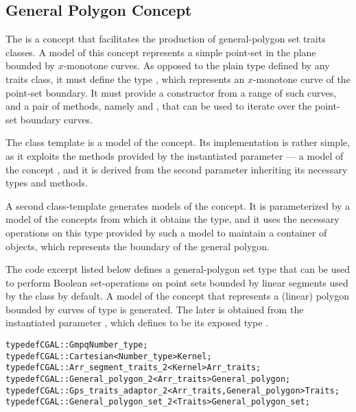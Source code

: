 \subsection{General Polygon Concept}
\label{bobs_ssec:general_polygon_concept}
The  is a concept that facilitates the
production of general-polygon set traits classes. A model of this
concept represents a simple point-set in the plane bounded
by $x$-monotone curves. As opposed to the plain
 type defined by any traits class, it must
define the type , which represents an
$x$-monotone curve of the point-set boundary. It must provide a
constructor from a range of such curves, and a pair of methods, namely
 and , that can be used to
iterate over the point-set boundary curves.
 
The 
class template is a model of the 
concept. Its implementation is rather simple, as it exploits the
methods provided by the instantiated parameter
 --- a model of the concept
, and it is derived from the second
parameter  inheriting its necessary types
and methods. 

A second class-template
generates models of the  concept. It is
parameterized by a model of the 
concepts from which it obtains the  type, and
it uses the necessary operations on this type provided by such a model
to maintain a container of  objects, which
represents the boundary of the general polygon.

The code excerpt listed below defines a general-polygon set type that
can be used to perform Boolean set-operations on point sets bounded by
linear segments used by the  class by default. A
model of the  concept that represents a
(linear) polygon bounded by curves of type  is
generated. The later is obtained from the instantiated parameter
, which defines  to be
its exposed type .
\begin{alltt}
typedef CGAL::Gmpq                                             Number_type;
typedef CGAL::Cartesian<Number_type>                           Kernel;
typedef CGAL::Arr_segment_traits_2<Kernel>                     Arr_traits;
typedef CGAL::General_polygon_2<Arr_traits>                    General_polygon;
typedef CGAL::Gps_traits_adaptor_2<Arr_traits,General_polygon> Traits;
typedef CGAL::General_polygon_set_2<Traits>                    General_polygon_set;
\end{alltt}

